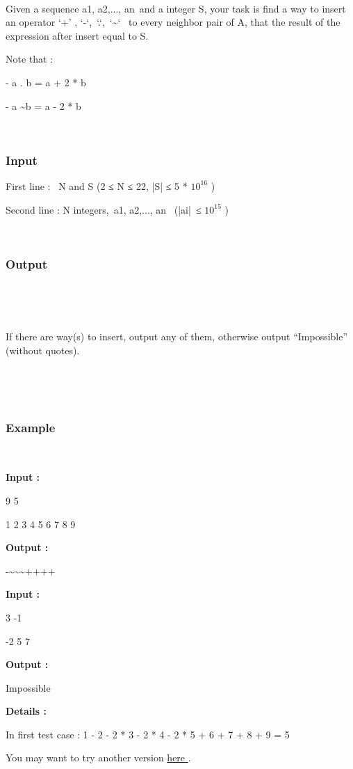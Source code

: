 

 

Given a sequence a1, a2,..., an and a integer S, your task is find a way to insert an operator ‘+’ , ‘-‘, ‘.‘, ‘\textasciitilde‘  to every neighbor pair of A, that the result of the expression after insert equal to S.

Note that :


- a . b = a + 2 * b


- a \textasciitilde b = a - 2 * b

 

\subsubsection{\textbf{\textbf{Input }}}




First line :  N and S (2 ≤ N ≤ 22, |S| ≤ 5 * $10^{16}$ )


Second line : N integers, a1, a2,..., an  (|ai| ≤ $10^{15}$ )

 

\subsubsection{\textbf{\textbf{Output }}}

 

 

If there are way(s) to insert, output any of them, otherwise output “Impossible” (without quotes).

 

 

\subsubsection{\textbf{Example }}

 

\textbf{Input : }


9 5

1 2 3 4 5 6 7 8 9

\textbf{Output : }


-\textasciitilde\textasciitilde\textasciitilde++++




\textbf{Input : }


3 -1

-2 5 7


\textbf{Output : }


Impossible




\textbf{Details : }


In first test case : 1 - 2 - 2 * 3 - 2 * 4 - 2 * 5 + 6 + 7 + 8 + 9 = 5

You may want to try another version \href{/problems/show/BLOPER}{ here } .
